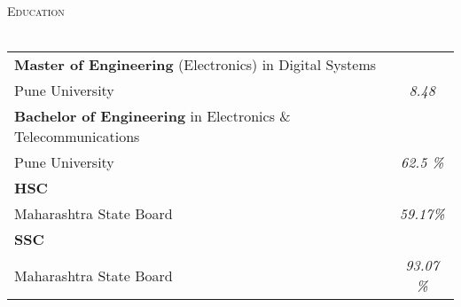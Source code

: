 \documentclass[a4paper]{article}
\newcommand{\lineunder} {
    \vspace*{-8pt} \\
    \hspace*{-18pt} \hrulefill \\
}
\newcommand{\header} [1] {
    {\hspace*{-18pt}\vspace*{6pt} \textsc{#1}}
    \vspace*{-6pt} \lineunder
}
\begin{document}
\header{Education}
\vspace{1mm}
\bgroup
\def\arraystretch{1.2}
\begin{tabularx}{\textwidth}{ | X | c | }
  \hline

\textbf{Master of Engineering} (Electronics) in Digital Systems & \\
Pune University & \textit{8.48} \\
  \hline

\textbf{Bachelor of Engineering} in Electronics \& Telecommunications & \\
Pune University & \textit{62.5 \%} \\
  \hline

\textbf{HSC} &\\
Maharashtra State Board & \textit{59.17\%}  \\
  \hline

  \textbf{SSC} & \\
Maharashtra State Board & \textit{93.07 \%} \\
  \hline

\end{tabularx}
\egroup
\vspace{2mm}
\end{document}
